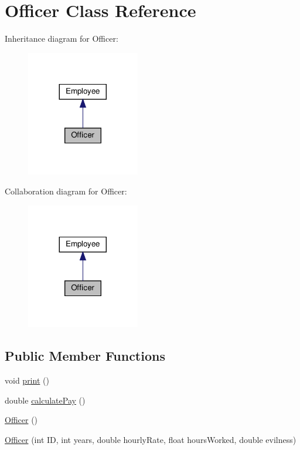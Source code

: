 \hypertarget{classOfficer}{}\section{Officer Class Reference}
\label{classOfficer}


Inheritance diagram for Officer\+:
\nopagebreak
\begin{figure}[H]
\begin{center}
\leavevmode
\includegraphics[width=140pt]{classOfficer__inherit__graph}
\end{center}
\end{figure}


Collaboration diagram for Officer\+:
\nopagebreak
\begin{figure}[H]
\begin{center}
\leavevmode
\includegraphics[width=140pt]{classOfficer__coll__graph}
\end{center}
\end{figure}
\subsection*{Public Member Functions}
\begin{DoxyCompactItemize}
\item 
void \hyperlink{classOfficer_aeadece05a1a0b7fb29bd412830d2e07a}{print} ()
\item 
double \hyperlink{classOfficer_a1fa1aad39b9e95be7a088990ebf17059}{calculate\+Pay} ()
\item 
\hyperlink{classOfficer_a80ac1e36a3f36c3a7e12b5dc9320ad89}{Officer} ()
\item 
\hyperlink{classOfficer_ac75c45d6e8628606278cb4ce6596f67f}{Officer} (int ID, int years, double hourly\+Rate, float hours\+Worked, double evilness)
\end{DoxyCompactItemize}
